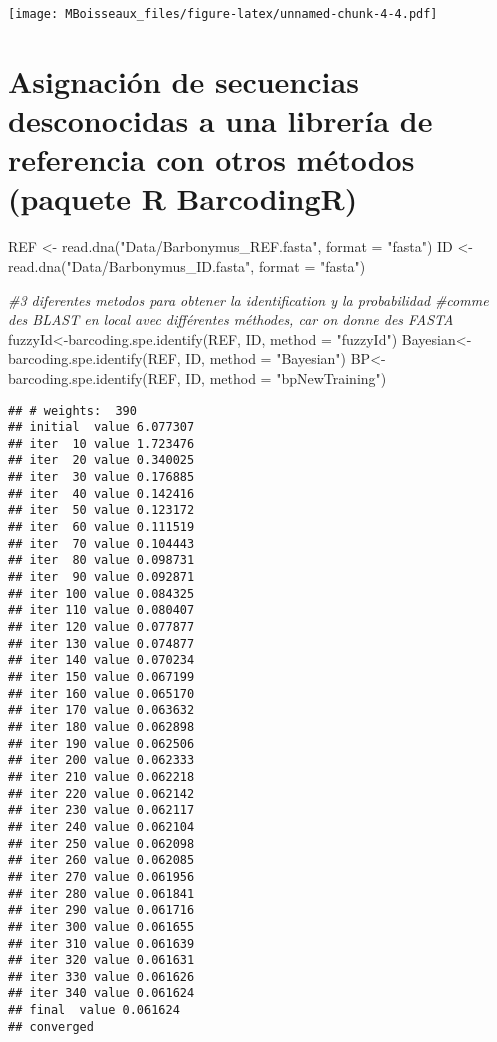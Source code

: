 \documentclass[
]{book}
\newenvironment{Shaded}{\begin{snugshade}}{\end{snugshade}}
\newcommand{\AttributeTok}[1]{\textcolor[rgb]{0.77,0.63,0.00}{#1}}
\newcommand{\CommentTok}[1]{\textcolor[rgb]{0.56,0.35,0.01}{\textit{#1}}}
\newcommand{\FunctionTok}[1]{\textcolor[rgb]{0.00,0.00,0.00}{#1}}
\newcommand{\NormalTok}[1]{#1}
\newcommand{\OtherTok}[1]{\textcolor[rgb]{0.56,0.35,0.01}{#1}}
\newcommand{\StringTok}[1]{\textcolor[rgb]{0.31,0.60,0.02}{#1}}
\begin{document}
\texttt{[image: MBoisseaux\_files/figure-latex/unnamed-chunk-4-4.pdf]}

\hypertarget{asignaciuxf3n-de-secuencias-desconocidas-a-una-libreruxeda-de-referencia-con-otros-muxe9todos-paquete-r-barcodingr}{%
\section*{Asignación de secuencias desconocidas a una librería de referencia con otros métodos (paquete R BarcodingR)}\label{asignaciuxf3n-de-secuencias-desconocidas-a-una-libreruxeda-de-referencia-con-otros-muxe9todos-paquete-r-barcodingr}}

\begin{Shaded}
\begin{Highlighting}[]
\NormalTok{REF }\OtherTok{\textless{}{-}} \FunctionTok{read.dna}\NormalTok{(}\StringTok{"Data/Barbonymus\_REF.fasta"}\NormalTok{, }\AttributeTok{format =} \StringTok{"fasta"}\NormalTok{)}
\NormalTok{ID }\OtherTok{\textless{}{-}} \FunctionTok{read.dna}\NormalTok{(}\StringTok{"Data/Barbonymus\_ID.fasta"}\NormalTok{, }\AttributeTok{format =} \StringTok{"fasta"}\NormalTok{)}

\CommentTok{\#3 diferentes metodos para obtener la identification y la probabilidad}
\CommentTok{\#comme des BLAST en local avec différentes méthodes, car on donne des FASTA}
\NormalTok{fuzzyId}\OtherTok{\textless{}{-}}\FunctionTok{barcoding.spe.identify}\NormalTok{(REF, ID, }\AttributeTok{method =} \StringTok{"fuzzyId"}\NormalTok{)}
\NormalTok{Bayesian}\OtherTok{\textless{}{-}}\FunctionTok{barcoding.spe.identify}\NormalTok{(REF, ID, }\AttributeTok{method =} \StringTok{"Bayesian"}\NormalTok{)}
\NormalTok{BP}\OtherTok{\textless{}{-}}\FunctionTok{barcoding.spe.identify}\NormalTok{(REF, ID, }\AttributeTok{method =} \StringTok{"bpNewTraining"}\NormalTok{)}
\end{Highlighting}
\end{Shaded}

\begin{verbatim}
## # weights:  390
## initial  value 6.077307 
## iter  10 value 1.723476
## iter  20 value 0.340025
## iter  30 value 0.176885
## iter  40 value 0.142416
## iter  50 value 0.123172
## iter  60 value 0.111519
## iter  70 value 0.104443
## iter  80 value 0.098731
## iter  90 value 0.092871
## iter 100 value 0.084325
## iter 110 value 0.080407
## iter 120 value 0.077877
## iter 130 value 0.074877
## iter 140 value 0.070234
## iter 150 value 0.067199
## iter 160 value 0.065170
## iter 170 value 0.063632
## iter 180 value 0.062898
## iter 190 value 0.062506
## iter 200 value 0.062333
## iter 210 value 0.062218
## iter 220 value 0.062142
## iter 230 value 0.062117
## iter 240 value 0.062104
## iter 250 value 0.062098
## iter 260 value 0.062085
## iter 270 value 0.061956
## iter 280 value 0.061841
## iter 290 value 0.061716
## iter 300 value 0.061655
## iter 310 value 0.061639
## iter 320 value 0.061631
## iter 330 value 0.061626
## iter 340 value 0.061624
## final  value 0.061624 
## converged
\end{verbatim}
\end{document}
